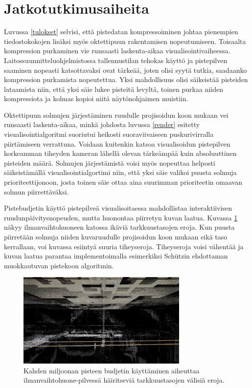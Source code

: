 \section{Jatkotutkimusaiheita}\label{jatko}

Luvussa \ref{tulokset} selvisi, että pistedatan kompressoiminen johtaa pienempien tiedostokokojen lisäksi myös oktettipuun rakentamisen nopeutumiseen. Toisaalta kompression purkaminen vie runsaasti laskenta-aikaa visualisointivaiheessa. Laitossuunnitteluohjelmistossa tallennustilan tehokas käyttö ja pistepilven saaminen nopeasti katsottavaksi ovat tärkeää, joten olisi syytä tutkia, saadaanko kompression purkamista nopeutettua. Yksi mahdollisuus olisi säikeistää pisteiden lataamista niin, että yksi säie lukee pisteitä levyltä, toinen purkaa niiden kompressiota ja kolmas kopioi niitä näytönohjaimen muistiin.

Oktettipuun solmujen järjestäminen ruudulle projisoidun koon mukaan vei runsaasti laskenta-aikaa, minkä johdosta luvussa \ref{render} esitetty visualisointialgoritmi suoriutui heikosti suoraviivaiseen puskurivirralla piirtämiseen verrattuna. Voidaan kuitenkin katsoa visualisoidun pistepilven korkeamman tiheyden kameran lähellä olevan tärkeämpää kuin absoluuttinen pisteiden määrä. Solmujen järjestämistä voisi myös nopeuttaa helposti säikeistämällä visualisointialgortimi niin, että yksi säie valikoi puusta solmuja prioriteettijonoon, josta toinen säie ottaa aina suurimman prioriteetin omaavan solmun piirrettäväksi.

Pistebudjetin käyttö pistepilveä visualisoitaessa mahdollistaa interaktiivisen ruudunpäivitysnopeuden, mutta huonontaa piirretyn kuvan laatua. Kuvassa \ref{lod_border} näkyy ilmanvaihtohuoneen katossa ikäviä tarkkuustasojen eroja. Kun puusta piirretään solmuja niiden kuvaruudulle projisoidun koon mukaan eikä taso kerrallaan, voi kuvassa esiintyä suuria tiheyseroja. Tiheyseroja voisi vähentää ja kuvan laatua parantaa implementoimalla esimerkiksi Schützin \cite{potree} ehdottaman muokkautuvan pistekoon algoritmin. 

\begin{figure}
    \centering
    \includegraphics[width=0.75\textwidth]{tuloksia/ilmastointi_2M/ilmastointihuone_vesijohto_overviewbuf.png}
    \caption{Kahden miljoonan pisteen budjetin käyttäminen aiheuttaa ilmanvaihtohuone-pilvessä häiritseviä tarkkuustasojen välisiä eroja.}
    \label{lod_border}
\end{figure}

